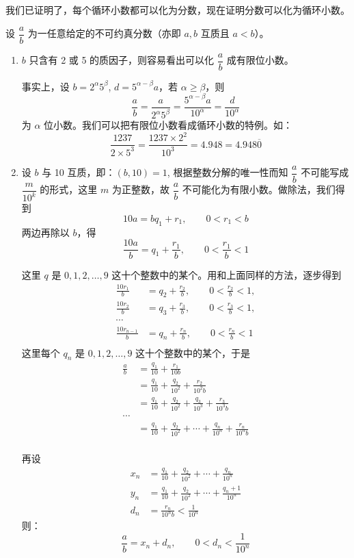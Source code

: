 我们已证明了，每个循环小数都可以化为分数，现在证明分数可以化为循环小数。

设 $\dfrac{a}{b}$ 为一任意给定的不可约真分数（亦即 $a,b$ 互质且 $a<b$）。

\medskip
\begin{enumerate}
  \item $b$ 只含有 2 或 5 的质因子，则容易看出可以化 $\dfrac{a}{b}$ 成有限位小数。

事实上，设 $b=2^{\alpha}5^{\beta}$, $d=5^{\alpha-\beta}a$，若 $\alpha\geqslant \beta$，则
\[\frac{a}{b}=\frac{a}{2^{\alpha}5^{\beta}}=\frac{5^{\alpha-\beta}a}{10^{\alpha}}=\frac{d}{10^{\alpha}}\]
为 $\alpha$ 位小数。我们可以把有限位小数看成循环小数的特例。如：
\[\frac{1237}{2\times 5^3}=\frac{1237\times 2^2}{10^3}=4.948=4.948\overline{0}\]

\item\label{itm:proof_fraction_step2} 设 $b$ 与 10 互质，即：$(b,10)=1$, 根据整数分解的唯一性而知 $\dfrac{a}{b}$ 不可能写成 $\dfrac{m}{10^k}$ 的形式，这里 $m$ 为正整数，故 $\dfrac{a}{b}$ 不可能化为有限小数。做除法，我们得到
\[10a=bq_1+r_1,\qquad 0<r_1<b\]
两边再除以 $b$，得
\[\frac{10a}{b}=q_1+\frac{r_1}{b},\qquad 0<\frac{r_1}{b}<1\]

这里 $q$ 是 $0,1,2,\ldots,9$ 这十个整数中的某个。用和上面同样的方法，逐步得到
\[\begin{split}
    \frac{10r_1}{b}&=q_2+\frac{r_2}{b},\qquad 0<\frac{r_2}{b}<1,\\
    \frac{10r_2}{b}&=q_3+\frac{r_3}{b},\qquad 0<\frac{r_3}{b}<1,\\
\cdots  \\
    \frac{10r_{n-1}}{b}&=q_n+\frac{r_n}{b},\qquad 0<\frac{r_n}{b}<1\\
\end{split}\]
这里每个 $q_n$ 是 $0,1,2,\ldots,9$ 这十个整数中的某个，于是
\[\begin{split}
    \frac{a}{b}&=\frac{q_1}{10}+\frac{r_1}{10b}\\
    &=\frac{q_1}{10}+\frac{q_2}{10^2}+\frac{r_2}{10^2b}\\
    &=\frac{q_1}{10}+\frac{q_2}{10^2}+\frac{q_3}{10^3}+\frac{r_3}{10^3b}\\
    \cdots  \\
    &=\frac{q_1}{10}+\frac{q_2}{10^2}+\cdots+\frac{q_n}{10^n}+\frac{r_n}{10^n b}\\
\end{split}\]

再设
\[\begin{split}
    x_n&=\frac{q_1}{10}+\frac{q_2}{10^2}+\cdots+\frac{q_n}{10^n}\\
    y_n&=\frac{q_1}{10}+\frac{q_2}{10^2}+\cdots+\frac{q_n+1}{10^n}\\
    d_n&=\frac{r_n}{10^n b}<\frac{1}{10^n}
\end{split}\]
则：
\[\frac{a}{b}=x_n+d_n,\qquad 0<d_n<\frac{1}{10^n}\]


\end{enumerate}
